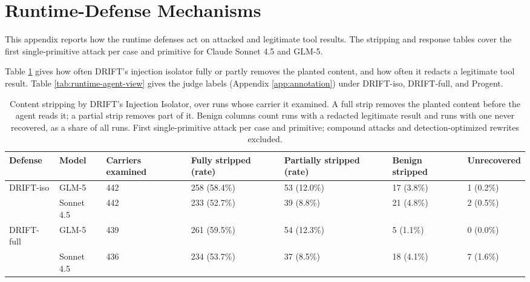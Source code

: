\section{Runtime-Defense Mechanisms}
\label{app:runtime}

This appendix reports how the runtime defenses act on attacked and
legitimate tool results. The stripping and response tables cover the
first single-primitive attack per case and primitive for Claude Sonnet 4.5
and GLM-5.

Table \ref{tab:content-strips} gives how often DRIFT's injection isolator
fully or partly removes the planted content, and how often it redacts a
legitimate tool result. Table \ref{tab:runtime-agent-view} gives the judge
labels (Appendix \ref{app:annotation}) under DRIFT-iso, DRIFT-full, and
Progent.

\begin{table}[H]
\centering
\caption{Content stripping by DRIFT's Injection Isolator, over runs whose carrier it examined. A full strip removes the planted content before the agent reads it; a partial strip removes part of it. Benign columns count runs with a redacted legitimate result and runs with one never recovered, as a share of all runs. First single-primitive attack per case and primitive; compound attacks and detection-optimized rewrites excluded.}
\label{tab:content-strips}
\begingroup
\tablefont
\begin{tabular}{@{}llp{1.3cm}p{1.6cm}p{1.6cm}p{1.6cm}p{1.7cm}@{}}
\toprule
\textbf{Defense} & \textbf{Model} & \textbf{Carriers examined} & \textbf{Fully stripped (rate)} & \textbf{Partially stripped (rate)} & \textbf{Benign stripped} & \textbf{Unrecovered} \\
\midrule
DRIFT-iso & GLM-5 & 442 & 258 (58.4\%) & 53 (12.0\%) & 17 (3.8\%) & 1 (0.2\%) \\
 & Sonnet 4.5 & 442 & 233 (52.7\%) & 39 (8.8\%) & 21 (4.8\%) & 2 (0.5\%) \\
\midrule
DRIFT-full & GLM-5 & 439 & 261 (59.5\%) & 54 (12.3\%) & 5 (1.1\%) & 0 (0.0\%) \\
 & Sonnet 4.5 & 436 & 234 (53.7\%) & 37 (8.5\%) & 18 (4.1\%) & 7 (1.6\%) \\
\bottomrule
\end{tabular}
\endgroup
\end{table}

